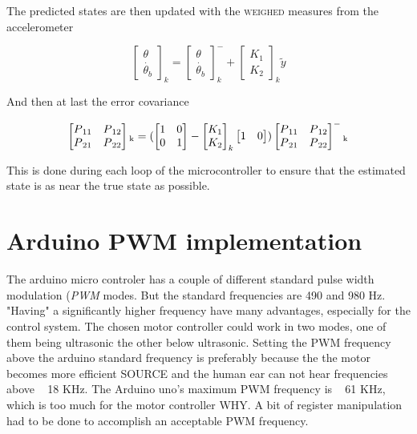 \documentclass[a4paper,11pt]{kth-mag}
\begin{document}
The predicted states are then updated with the \textsc{weighed} measures from the accelerometer

\begin{equation}
\begin{bmatrix}
\theta \\
\dot{\theta_b}
\end{bmatrix}_k
=
\begin{bmatrix}
\theta \\
\dot{\theta_b}
\end{bmatrix}_k^-
+
\begin{bmatrix}
K_1 \\ K_2
\end{bmatrix}_k
\textbf{$\tilde{y}$}
\end{equation}

And then at last the error covariance

\begin{equation}
\begin{bmatrix}
P\textsubscript{11} & P\textsubscript{12} \\
P\textsubscript{21} & P\textsubscript{22}
\end{bmatrix}\textsubscript{k} 
=(
 \begin{bmatrix}
1 & 0 \\
0 & 1
\end{bmatrix}
-
\begin{bmatrix}
K_1 \\ K_2
\end{bmatrix}_k
\begin{bmatrix}
1 & 0
\end{bmatrix}
)
\begin{bmatrix}
P\textsubscript{11} & P\textsubscript{12} \\
P\textsubscript{21} & P\textsubscript{22}
\end{bmatrix}^-\textsubscript{k}
\end{equation}


This is done during each loop of the microcontroller to ensure that the estimated state is as near the true state as possible.

\section{Arduino PWM implementation} \label{app: PWM}
The arduino micro controler has a couple of different standard pulse width modulation (\textit{PWM} modes. But the standard frequencies are 490 and 980 Hz. "Having" a significantly higher 
frequency have many advantages, especially for the control system. The chosen motor controller could work in two modes, one of them being ultrasonic the other below ultrasonic. Setting the PWM frequency above the arduino standard frequency is preferably because the the motor becomes more efficient \textsc{SOURCE} and the human ear can not hear frequencies above ~ 18 KHz. The Arduino uno's maximum PWM frequency is ~ 61 KHz, which is too much for the motor controller \textsc{WHY}. A bit of register manipulation had to be 
done to accomplish an acceptable PWM frequency.
\end{document}
